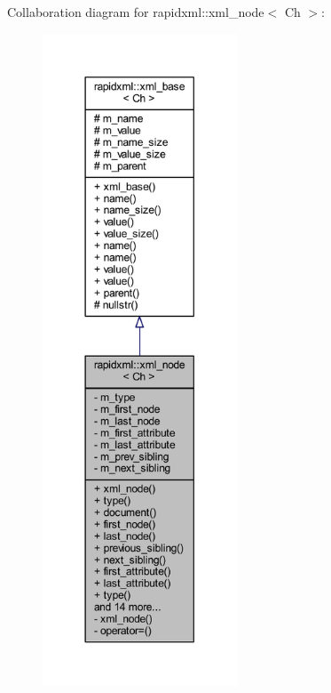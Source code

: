 Collaboration diagram for rapidxml\+:\+:xml\+\_\+node$<$ Ch $>$\+:\nopagebreak
\begin{figure}[H]
\begin{center}
\leavevmode
\includegraphics[height=550pt]{singletonrapidxml_1_1xml__node__coll__graph}
\end{center}
\end{figure}
